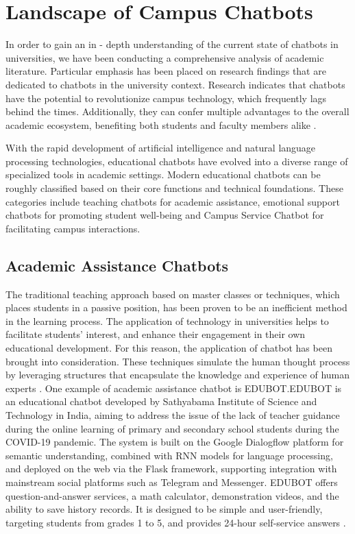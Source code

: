 \documentclass{xum_review}
\begin{document}
\section{Landscape of Campus Chatbots}
In order to gain an in - depth understanding of the current state of chatbots in
universities, we have been conducting a comprehensive analysis of academic
literature. Particular emphasis has been placed on research findings that are
dedicated to chatbots in the university context. Research indicates that
chatbots have the potential to revolutionize campus technology, which frequently
lags behind the times. Additionally, they can confer multiple advantages to the
overall academic ecosystem, benefiting both students and faculty members alike
\citep{dibitonto2018chatbot}.

With the rapid development of artificial intelligence and natural language
processing technologies, educational chatbots have evolved into a diverse range
of specialized tools in academic settings. Modern educational chatbots can be
roughly classified based on their core functions and technical foundations.
These categories include teaching chatbots for academic assistance, emotional
support chatbots for promoting student well-being and Campus Service Chatbot for
facilitating campus interactions.

\subsection{Academic Assistance Chatbots}

The traditional teaching approach based on master classes or techniques, which
places students in a passive position, has been proven to be an inefficient
method in the learning process. The application of technology in universities
helps to facilitate students' interest, and enhance their engagement in their
own educational development. For this reason, the application of chatbot has
been brought into consideration. These techniques simulate the human thought
process by leveraging structures that encapsulate the knowledge and experience
of human experts \citep{villegas2020proposal}. One
example of academic assistance chatbot is EDUBOT.EDUBOT is an educational
chatbot developed by Sathyabama Institute of Science and Technology in India,
aiming to address the issue of the lack of teacher guidance during the online
learning of primary and secondary school students during the COVID-19 pandemic.
The system is built on the Google Dialogflow platform for semantic
understanding, combined with RNN models for language processing, and deployed on
the web via the Flask framework, supporting integration with mainstream social
platforms such as Telegram and Messenger. EDUBOT offers question-and-answer
services, a math calculator, demonstration videos, and the ability to save
history records. It is designed to be simple and user-friendly, targeting
students from grades 1 to 5, and provides 24-hour self-service answers \citep{sophia2021edubot}.
\end{document}
